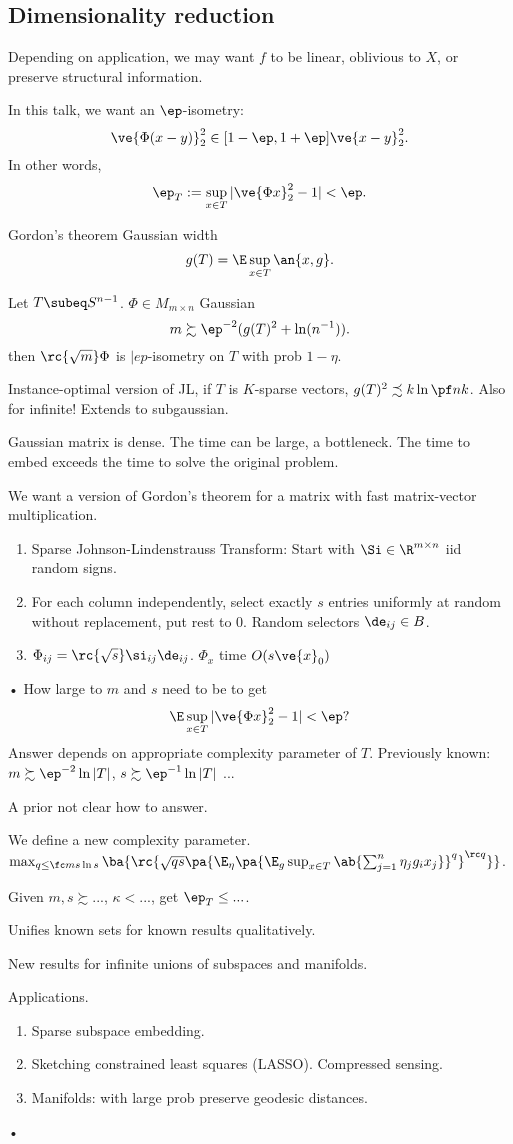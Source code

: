 \subsection{Dimensionality reduction}

Depending on application, we may want $f$ to be linear, oblivious to $X$, or preserve structural information.

In this talk, we want an $\ep$-isometry:
\[
\ve{\Phi(x-y)}_2^2\in[1-\ep,1+\ep]\ve{x-y}_2^2.
\]
In other words,
\[
\ep_T:=\sup_{x\in T}|\ve{\Phi x}_2^2-1|<\ep.
\]

Gordon's theorem
Gaussian width
\[
g(T)=\E \sup_{x\in T} \an{x,g}.
\]
\begin{thm}
Let $T\subeq S^{n-1}$. $\Phi\in M_{m\times n}$ Gaussian
\[
m\succsim \ep^{-2}(g(T)^2+\ln (n^{-1})).
\]
then $\rc{\sqrt m} \Phi$ is $|ep$-isometry on $T$ with prob $1-\eta$.
\end{thm}
Instance-optimal version of JL, if $T$ is $K$-sparse vectors, $g(T)^2\precsim k\ln \pf nk$. Also for infinite!
Extends to subgaussian.


Gaussian matrix is dense. The time can be large, a bottleneck. The time to embed exceeds the time to solve the original problem.

We want a version of Gordon's theorem for a matrix with fast matrix-vector multiplication.
\begin{enumerate}
\item
Sparse Johnson-Lindenstrauss Transform: Start with $\Si\in \R^{m\times n}$ iid random signs. 
\item For each column independently, select exactly $s$ entries uniformly at random without replacement, put rest to 0. Random selectors $\de_{ij}\in B$.
\item
$\Phi_{ij}=\rc{\sqrt{s}}\si_{ij}\de_{ij}$. $\Phi_x$ time $O(s\ve{x}_0)$
\end{enumerate}•
How large to $m$ and $s$ need to be to get 
\[
\E\sup_{x\in T} |\ve{\Phi x}_2^2 - 1|<\ep?
\]
Answer depends on appropriate complexity parameter of $T$.
Previously known: $m\succsim \ep^{-2}\ln |T|$, $s\succsim \ep^{-1}\ln |T|$
...

A prior not clear how to answer.

We define a new complexity parameter.$\max_{q\le \fc ms\ln s}\ba{
\rc{\sqrt{qs}\pa{\E_\eta\pa{\E_g\sup_{x\in T}\ab{\sum_{j=1}^n \eta_jg_ix_j}}^q}^{\rc q}
}}$.

Given $m,s\succsim ...$, $\kappa<...$, get $\ep_T\le...$.

Unifies known sets for known results qualitatively.

New results for infinite unions of subspaces and manifolds.

Applications.
\begin{enumerate}
\item
Sparse subspace embedding. 
\item
Sketching constrained least squares (LASSO).
Compressed sensing. %
\item
Manifolds: with large prob preserve geodesic distances.
\end{enumerate}•